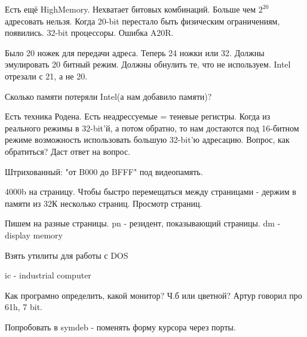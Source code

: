 Есть ещё HighMemory. Нехватает битовых комбинаций. Больше чем $2^20$ адресовать нельзя. Когда 20-bit перестало быть физическим ограничениям, появились. 32-bit процессоры. Ошибка A20R. 

Было 20 ножек для передачи адреса. Теперь 24 ножки или 32. Должны эмулировать 20 битный режим. Должны обнулить те, что не используем. Intel отрезали с 21, а не 20. 

\begin{hw}Сколько памяти потеряли Intel(а нам добавило памяти)?\end{hw} Есть техника Родена. Есть неадрессуемые = теневые регистры. Когда из реального режимы в 32-bit'й, а потом обратно, то нам достаются под 16-битном режиме возможность использовать большую 32-bit'ю адресацию. Вопрос, как обратиться? Даст ответ на вопрос. 

Штрихованный: "от B000 до BFFF" под видеопамять. 

4000b на страницу. Чтобы быстро перемещаться между страницами - держим в памяти из 32К несколько страниц. Просмотр страниц.

Пишем на разные страницы. 
pn - резидент, показывающий страницы.
dm - display memory
\begin{hw}Взять утилиты для работы с DOS\end{hw}
ic - industrial computer

Как програмно определить, какой монитор? Ч.б или цветной?
Артур говорил про 61h, 7 bit.

\begin{hw}Попробовать в symdeb - поменять форму курсора через порты.\end{hw} 